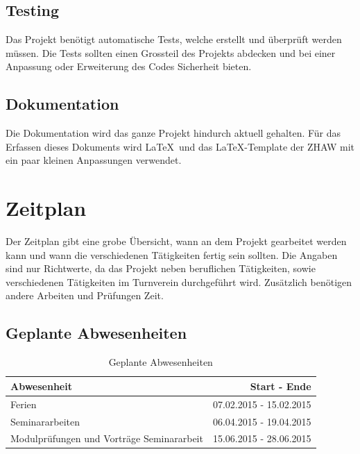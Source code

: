 \subsection{Testing}\label{testing}
Das Projekt benötigt automatische Tests, welche erstellt und überprüft werden müssen. Die Tests sollten einen Grossteil des Projekts abdecken und bei einer Anpassung oder Erweiterung des 
Codes Sicherheit bieten.

\subsection{Dokumentation}\label{dokumentation}
Die Dokumentation wird das ganze Projekt hindurch aktuell gehalten. Für das Erfassen dieses Dokuments wird \LaTeX\ und das \LaTeX-Template der ZHAW \cite{zhaw_latex_template} mit ein 
paar kleinen Anpassungen verwendet.

\section{Zeitplan}\label{zeitplan}
Der Zeitplan gibt eine grobe Übersicht, wann an dem Projekt gearbeitet werden kann und wann die verschiedenen Tätigkeiten fertig sein sollten. Die Angaben sind nur Richtwerte, da das 
Projekt neben beruflichen Tätigkeiten, sowie verschiedenen Tätigkeiten im Turnverein durchgeführt wird. Zusätzlich benötigen andere Arbeiten und Prüfungen Zeit.

\subsection{Geplante Abwesenheiten}
\begin{table}[ht]
\centering
  \begin{tabular}{ l | r }
	\hline
	\rowcolor{gray}
	\textbf{Abwesenheit}					&	\textbf{Start - Ende}	\\ \hline
	Ferien								&	07.02.2015 - 15.02.2015	\\ \hline
	Seminararbeiten						&	06.04.2015 - 19.04.2015	\\ \hline
	Modulprüfungen und Vorträge Seminararbeit		&	15.06.2015 - 28.06.2015	\\ \hline
  \end{tabular}
   \caption{Geplante Abwesenheiten}\label{table:holidays}
\end{table}

